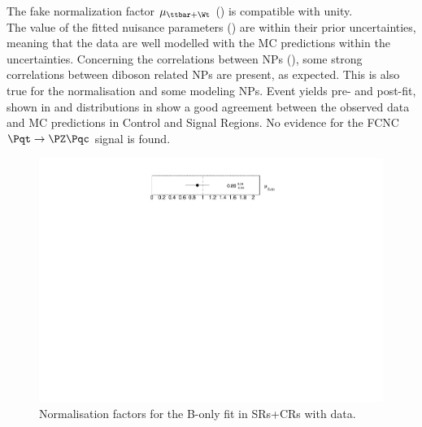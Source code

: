 The fake normalization factor $\mu_{\ttbar+\Wt}$ () is compatible with unity.\\
The value of the fitted nuisance parameters () are within their prior uncertainties,
meaning that the data are well modelled with the MC predictions within the uncertainties.
Concerning the correlations between NPs
(), some strong correlations
between diboson related NPs are present, as expected. This is also
true for the \ttbar normalisation and some \ttbar modeling NPs. 
Event yields pre- and post-fit, shown in  and distributions in  show a good agreement between the observed data and MC predictions in Control and Signal Regions. No evidence for the FCNC $\mathrm{\Pqt\rightarrow\PZ\Pqc}$ signal is found.

\begin{figure}[htbp]
	\centering
	\includegraphics[width=.5\textwidth]{Appendices/AP9/figures/BONLY_CRSR_DL1rc_unblind/NormFactors}
	\caption{Normalisation factors for the B-only \tZc fit in SRs+CRs with data.}%
	\label{fig:stat:tzc:bonly:crsr:norm_unb}
\end{figure}
\restoregeometry

